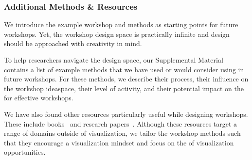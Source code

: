 
\subsubsection*{Additional Methods \& Resources} 

We introduce the example workshop and methods as starting points for future workshops. Yet, the workshop design space is practically infinite and design should be approached with creativity in mind.

To help researchers navigate the design space, our Supplemental Material contains a list of \numberOfExampleMethods example methods that we have used or would consider using in future workshops. For these methods, we describe their process, their influence on the workshop ideaspace, their level of activity, and their potential impact on the \tactics for effective workshops.

We have also found other resources particularly useful while designing workshops. These include books~\cite{CreativeEducationFoundation2015,Gray2010,Hamilton2016,Hohmann2007,Kumar2012,Michalko2006} and research papers~\cite{McFadzean1998,McKenna2014,Sanders2005}. Although these resources target a range of domains outside of visualization, we tailor the workshop methods such that they encourage a visualization mindset and focus on the \topic of visualization opportunities.